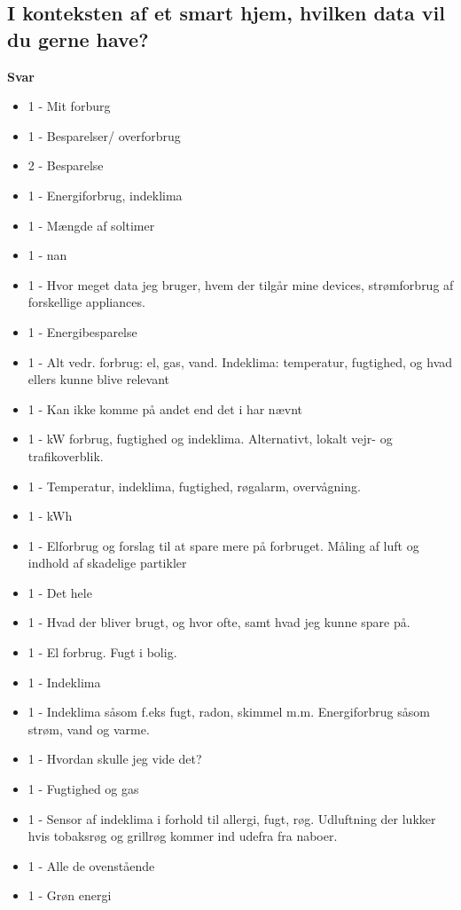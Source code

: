 \subsection{I konteksten af et smart hjem, hvilken data vil du gerne have?}
\textbf{Svar}
\begin{itemize}
    \item 1 - Mit forburg
    \item 1 - Besparelser/ overforbrug
    \item 2 - Besparelse
    \item 1 - Energiforbrug, indeklima
    \item 1 - Mængde af soltimer
    \item 1 - nan
    \item 1 - Hvor meget data jeg bruger, hvem der tilgår mine devices, strømforbrug af forskellige appliances.
    \item 1 - Energibesparelse
    \item 1 - Alt vedr. forbrug: el, gas, vand. Indeklima: temperatur, fugtighed, og hvad ellers kunne blive relevant
    \item 1 - Kan ikke komme på andet end det i har nævnt
    \item 1 - kW forbrug, fugtighed og indeklima. Alternativt, lokalt vejr- og trafikoverblik.
    \item 1 - Temperatur, indeklima, fugtighed, røgalarm, overvågning.
    \item 1 - kWh
    \item 1 - Elforbrug og forslag til at spare mere på forbruget. Måling af luft og indhold af skadelige partikler
    \item 1 - Det hele
    \item 1 - Hvad der bliver brugt, og hvor ofte, samt hvad jeg kunne spare på.
    \item 1 - El forbrug.  Fugt i bolig.
    \item 1 - Indeklima
    \item 1 - Indeklima såsom f.eks fugt, radon, skimmel m.m. Energiforbrug såsom strøm, vand og varme.
    \item 1 - Hvordan skulle jeg vide det?
    \item 1 - Fugtighed og gas
    \item 1 - Sensor af indeklima i forhold til allergi, fugt, røg. Udluftning der lukker hvis tobaksrøg og grillrøg kommer ind udefra fra naboer.
    \item 1 - Alle de ovenstående
    \item 1 - Grøn energi

\end{itemize}
